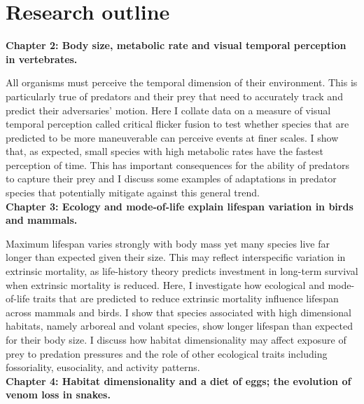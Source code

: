 \section{\uppercase{R}esearch outline}


\textbf{Chapter 2: Body size, metabolic rate and visual temporal perception in vertebrates.}


 All organisms must perceive the temporal dimension of their environment. This is particularly true of predators and their prey that need to accurately track and predict their adversaries' motion. Here I collate data on a measure of visual temporal perception called critical flicker fusion to test whether species that are predicted to be more maneuverable can perceive events at finer scales. I show that, as expected, small species with high metabolic rates have the fastest perception of time. This has important consequences for the ability of predators to capture their prey and I discuss some examples of adaptations in predator species that potentially mitigate against this general trend.\\


\textbf{Chapter 3: Ecology and mode-of-life explain lifespan variation in birds and mammals.}


Maximum lifespan varies strongly with body mass yet many species live far longer than expected given their size. This may reflect interspecific variation in extrinsic mortality, as life-history theory predicts investment in long-term survival when extrinsic mortality is reduced. Here, I investigate how ecological and mode-of-life traits that are predicted to reduce extrinsic mortality influence lifespan across mammals and birds. I show that species associated with high dimensional habitats, namely arboreal and volant species, show longer lifespan than expected for their body size. I discuss how habitat dimensionality may affect exposure of prey to predation pressures and the role of other ecological traits including fossoriality, eusociality, and activity patterns.\\




\textbf{Chapter 4: Habitat dimensionality and a diet of eggs; the evolution of venom loss in snakes.}


